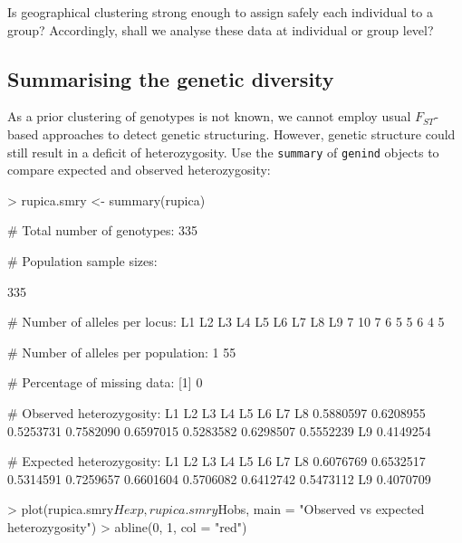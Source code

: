 \documentclass{article}
\begin{document}
Is geographical clustering strong enough to assign safely each individual to a group?
Accordingly, shall we analyse these data at individual or group level?





\subsection{Summarising the genetic diversity}
As a prior clustering of genotypes is not known, we cannot employ usual
$F_{ST}$-based approaches to detect genetic structuring.
However, genetic structure could still result in a deficit of
heterozygosity.
Use the \texttt{summary} of \texttt{genind} objects to compare expected and
observed heterozygosity:
\begin{Schunk}
\begin{Sinput}
> rupica.smry <- summary(rupica)
\end{Sinput}
\begin{Soutput}
 # Total number of genotypes:  335 

 # Population sample sizes:  
    
335 

 # Number of alleles per locus:  
L1 L2 L3 L4 L5 L6 L7 L8 L9 
 7 10  7  6  5  5  6  4  5 

 # Number of alleles per population:  
 1 
55 

 # Percentage of missing data:  
[1] 0

 # Observed heterozygosity:  
       L1        L2        L3        L4        L5        L6        L7        L8 
0.5880597 0.6208955 0.5253731 0.7582090 0.6597015 0.5283582 0.6298507 0.5552239 
       L9 
0.4149254 

 # Expected heterozygosity:  
       L1        L2        L3        L4        L5        L6        L7        L8 
0.6076769 0.6532517 0.5314591 0.7259657 0.6601604 0.5706082 0.6412742 0.5473112 
       L9 
0.4070709 
\end{Soutput}
\begin{Sinput}
> plot(rupica.smry$Hexp, rupica.smry$Hobs, main = "Observed vs expected heterozygosity")
> abline(0, 1, col = "red")
\end{Sinput}
\end{Schunk}
\end{document}

